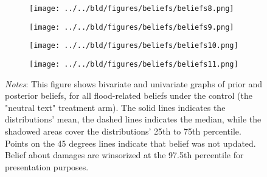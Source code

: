 \begin{figure}[H]
\centering
\caption{Belief updating under control}
\begin{subfigure}[b]{\linewidth}
\centering
\texttt{[image: ../../bld/figures/beliefs/beliefs8.png]}
\label{fig:risk-control}
\end{subfigure}
\hfill
\begin{subfigure}[b]{\linewidth}
\centering
\texttt{[image: ../../bld/figures/beliefs/beliefs9.png]}
\label{fig:damages-control}
\end{subfigure}
\hfill
\begin{subfigure}[b]{\linewidth}
\centering
\texttt{[image: ../../bld/figures/beliefs/beliefs10.png]}
\label{fig:comptot-control}
\end{subfigure}
\hfill
\begin{subfigure}[b]{\linewidth}
\centering
\texttt{[image: ../../bld/figures/beliefs/beliefs11.png]}
\label{fig:compshare-control}
\end{subfigure}
\label{fig:updating_active}  
\justifying
\footnotesize \textit{Notes}: This figure shows bivariate and univariate graphs of prior and posterior beliefs, for all flood-related beliefs under the control (the "neutral text" treatment arm). The solid lines indicates the distributions' mean, the dashed lines indicates the median, while the shadowed areas cover the distributions' 25th to 75th percentile. Points on the 45 degrees lines indicate that belief was not updated. Belief about damages are winsorized at the 97.5th percentile for presentation purposes.
\end{figure}









